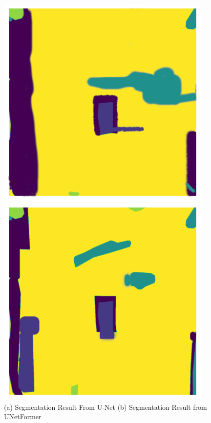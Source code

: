 \begin{figure}[!htb]
    \centering
    \begin{minipage}{0.5\textwidth}
        \centering
        \includegraphics[width=0.95\textwidth, height=0.35\textheight]{images/3592-unet.png}
    \end{minipage}\hfill
    \begin{minipage}{0.5\textwidth}
        \centering
        \includegraphics[width=0.95\textwidth, height=0.35\textheight]{images/3592-unetformer.png}
    \end{minipage}
\caption{(a) Segmentation Result From U-Net (b) Segmentation Result from UNetFormer}
\label{fig:result}
\end{figure}
\FloatBarrier


